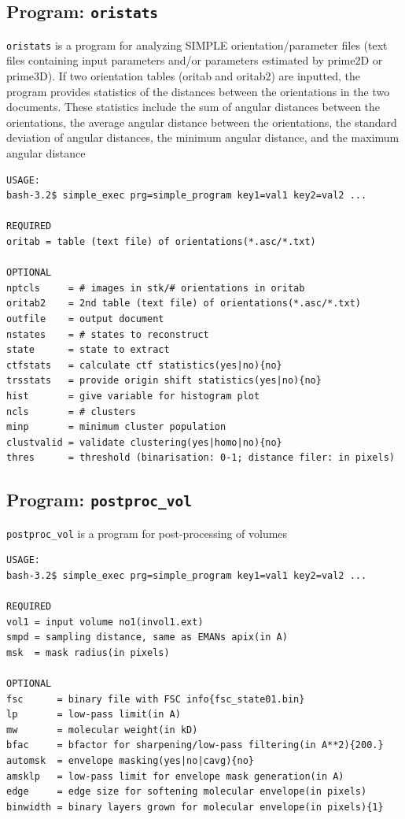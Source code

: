 \documentclass[a4paper,11pt]{article}
\newcommand{\prgname}[1]{\textcolor{NavyBlue}{\texttt{#1}}}
\begin{document}
\subsection{Program: \prgname{oristats}}
\label{oristats}
\prgname{oristats} is a program for analyzing SIMPLE orientation/parameter files (text files containing input parameters and/or parameters estimated by prime2D or prime3D). If two orientation tables (oritab and oritab2) are inputted, the program provides statistics of the distances between the orientations in the two documents. These statistics include the sum of angular distances between the orientations, the average angular distance between the orientations, the standard deviation of angular distances, the minimum angular distance, and the maximum angular distance

\begin{verbatim}
USAGE:
bash-3.2$ simple_exec prg=simple_program key1=val1 key2=val2 ...

REQUIRED
oritab = table (text file) of orientations(*.asc/*.txt)

OPTIONAL
nptcls     = # images in stk/# orientations in oritab
oritab2    = 2nd table (text file) of orientations(*.asc/*.txt)
outfile    = output document
nstates    = # states to reconstruct
state      = state to extract
ctfstats   = calculate ctf statistics(yes|no){no}
trsstats   = provide origin shift statistics(yes|no){no}
hist       = give variable for histogram plot
ncls       = # clusters
minp       = minimum cluster population
clustvalid = validate clustering(yes|homo|no){no}
thres      = threshold (binarisation: 0-1; distance filer: in pixels)
\end{verbatim}

\subsection{Program: \prgname{postproc\_vol}}
\label{postproc_vol}
\prgname{postproc\_vol} is a program for post-processing of volumes

\begin{verbatim}
USAGE:
bash-3.2$ simple_exec prg=simple_program key1=val1 key2=val2 ...

REQUIRED
vol1 = input volume no1(invol1.ext)
smpd = sampling distance, same as EMANs apix(in A)
msk  = mask radius(in pixels)

OPTIONAL
fsc      = binary file with FSC info{fsc_state01.bin}
lp       = low-pass limit(in A)
mw       = molecular weight(in kD)
bfac     = bfactor for sharpening/low-pass filtering(in A**2){200.}
automsk  = envelope masking(yes|no|cavg){no}
amsklp   = low-pass limit for envelope mask generation(in A)
edge     = edge size for softening molecular envelope(in pixels)
binwidth = binary layers grown for molecular envelope(in pixels){1}
\end{verbatim}
\end{document}
